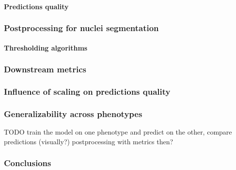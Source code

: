         \paragraph{Predictions quality}
            \label{section:nuclei-predictions}
              
    \subsubsection{Postprocessing for nuclei segmentation}
        
        \paragraph{Thresholding algorithms}
        
    \subsubsection{Downstream metrics}
        
    \subsubsection{Influence of scaling on predictions quality} 
        
    \subsubsection{Generalizability across phenotypes}
        TODO train the model on one phenotype and predict on the other, compare predictions (visually?) 
        postprocessing with metrics then?

    \subsubsection{Conclusions}
        
